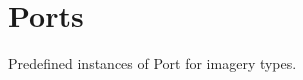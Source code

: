 \hypertarget{group___imagery_ports}{}\section{Ports}
\label{group___imagery_ports}
Predefined instances of Port for imagery types. 

